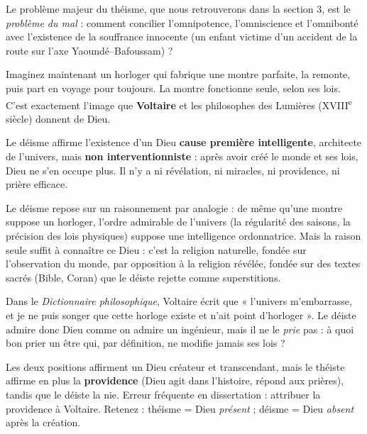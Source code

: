 \documentclass[11pt]{article}
\newcommand{\cle}[1]{{\popxbold\color{popdark}#1}}
\newcounter{popsec}
\newcounter{popsub}
\newcommand{\courssub}[1]{%
  \stepcounter{popsub}%
  \par\vspace{9pt}\noindent{\popxbold\fontsize{11.5}{13}\selectfont\color{popink}{\color{poporange}\thepopsec.\thepopsub}\hspace{6pt}#1}\par\nopagebreak\vspace{4pt}
}
\begin{document}
Le problème majeur du théisme, que nous retrouverons dans la section 3, est le \emph{problème du mal} : comment concilier l'omnipotence, l'omniscience et l'omnibonté avec l'existence de la souffrance innocente (un enfant victime d'un accident de la route sur l'axe Yaoundé--Bafoussam) ?

\courssub{Le déisme : l'horloger qui s'est retiré}

Imaginez maintenant un horloger qui fabrique une montre parfaite, la remonte, puis part en voyage pour toujours. La montre fonctionne seule, selon ses lois. C'est exactement l'image que \textbf{Voltaire} et les philosophes des \cle{Lumières} (XVIII\textsuperscript{e} siècle) donnent de Dieu.

\begin{definition}[Déisme]
Le \cle{déisme} affirme l'existence d'un Dieu \textbf{cause première intelligente}, architecte de l'univers, mais \textbf{non interventionniste} : après avoir créé le monde et ses lois, Dieu ne s'en occupe plus. Il n'y a ni révélation, ni miracles, ni providence, ni prière efficace.
\end{definition}

Le déisme repose sur un raisonnement par analogie : de même qu'une montre suppose un horloger, l'ordre admirable de l'univers (la régularité des saisons, la précision des lois physiques) suppose une intelligence ordonnatrice. Mais la raison seule suffit à connaître ce Dieu : c'est la \cle{religion naturelle}, fondée sur l'observation du monde, par opposition à la \cle{religion révélée}, fondée sur des textes sacrés (Bible, Coran) que le déiste rejette comme superstitions.

\begin{exemplebox}
Dans le \emph{Dictionnaire philosophique}, Voltaire écrit que « l'univers m'embarrasse, et je ne puis songer que cette horloge existe et n'ait point d'horloger ». Le déiste admire donc Dieu comme on admire un ingénieur, mais il ne le \emph{prie} pas : à quoi bon prier un être qui, par définition, ne modifie jamais ses lois ?
\end{exemplebox}

\begin{attention}
Les deux positions affirment un Dieu créateur et transcendant, mais le théiste affirme en plus la \textbf{providence} (Dieu agit dans l'histoire, répond aux prières), tandis que le déiste la nie. Erreur fréquente en dissertation : attribuer la providence à Voltaire. Retenez : théisme = Dieu \emph{présent} ; déisme = Dieu \emph{absent} après la création.
\end{attention}
\end{document}
